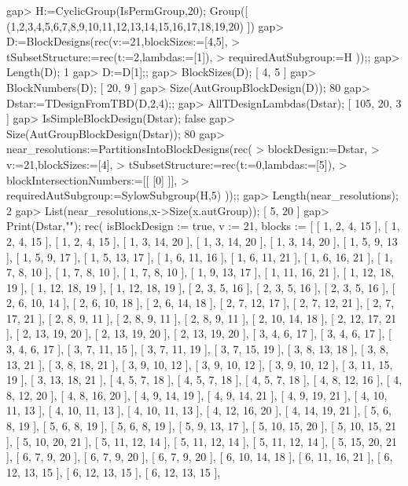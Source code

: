 \beginexample
gap> H:=CyclicGroup(IsPermGroup,20);
Group([ (1,2,3,4,5,6,7,8,9,10,11,12,13,14,15,16,17,18,19,20) ])
gap> D:=BlockDesigns(rec(v:=21,blockSizes:=[4,5],
>       tSubsetStructure:=rec(t:=2,lambdas:=[1]),
>       requiredAutSubgroup:=H ));;
gap> Length(D);
1
gap> D:=D[1];;
gap> BlockSizes(D);
[ 4, 5 ]
gap> BlockNumbers(D);
[ 20, 9 ]
gap> Size(AutGroupBlockDesign(D));
80
gap> Dstar:=TDesignFromTBD(D,2,4);;
gap> AllTDesignLambdas(Dstar);
[ 105, 20, 3 ]
gap> IsSimpleBlockDesign(Dstar);
false
gap> Size(AutGroupBlockDesign(Dstar));
80
gap> near_resolutions:=PartitionsIntoBlockDesigns(rec(
>    blockDesign:=Dstar,
>    v:=21,blockSizes:=[4],
>    tSubsetStructure:=rec(t:=0,lambdas:=[5]),
>    blockIntersectionNumbers:=[[ [0] ]],
>    requiredAutSubgroup:=SylowSubgroup(H,5) ));;
gap> Length(near_resolutions);
2
gap> List(near_resolutions,x->Size(x.autGroup));
[ 5, 20 ]
gap> Print(Dstar,"\n");
rec(
  isBlockDesign := true,
  v := 21,
  blocks := [ [ 1, 2, 4, 15 ], [ 1, 2, 4, 15 ], [ 1, 2, 4, 15 ], 
      [ 1, 3, 14, 20 ], [ 1, 3, 14, 20 ], [ 1, 3, 14, 20 ], [ 1, 5, 9, 13 ], 
      [ 1, 5, 9, 17 ], [ 1, 5, 13, 17 ], [ 1, 6, 11, 16 ], [ 1, 6, 11, 21 ], 
      [ 1, 6, 16, 21 ], [ 1, 7, 8, 10 ], [ 1, 7, 8, 10 ], [ 1, 7, 8, 10 ], 
      [ 1, 9, 13, 17 ], [ 1, 11, 16, 21 ], [ 1, 12, 18, 19 ], 
      [ 1, 12, 18, 19 ], [ 1, 12, 18, 19 ], [ 2, 3, 5, 16 ], [ 2, 3, 5, 16 ], 
      [ 2, 3, 5, 16 ], [ 2, 6, 10, 14 ], [ 2, 6, 10, 18 ], [ 2, 6, 14, 18 ], 
      [ 2, 7, 12, 17 ], [ 2, 7, 12, 21 ], [ 2, 7, 17, 21 ], [ 2, 8, 9, 11 ], 
      [ 2, 8, 9, 11 ], [ 2, 8, 9, 11 ], [ 2, 10, 14, 18 ], [ 2, 12, 17, 21 ], 
      [ 2, 13, 19, 20 ], [ 2, 13, 19, 20 ], [ 2, 13, 19, 20 ], 
      [ 3, 4, 6, 17 ], [ 3, 4, 6, 17 ], [ 3, 4, 6, 17 ], [ 3, 7, 11, 15 ], 
      [ 3, 7, 11, 19 ], [ 3, 7, 15, 19 ], [ 3, 8, 13, 18 ], [ 3, 8, 13, 21 ], 
      [ 3, 8, 18, 21 ], [ 3, 9, 10, 12 ], [ 3, 9, 10, 12 ], [ 3, 9, 10, 12 ], 
      [ 3, 11, 15, 19 ], [ 3, 13, 18, 21 ], [ 4, 5, 7, 18 ], [ 4, 5, 7, 18 ], 
      [ 4, 5, 7, 18 ], [ 4, 8, 12, 16 ], [ 4, 8, 12, 20 ], [ 4, 8, 16, 20 ], 
      [ 4, 9, 14, 19 ], [ 4, 9, 14, 21 ], [ 4, 9, 19, 21 ], [ 4, 10, 11, 13 ],
      [ 4, 10, 11, 13 ], [ 4, 10, 11, 13 ], [ 4, 12, 16, 20 ], 
      [ 4, 14, 19, 21 ], [ 5, 6, 8, 19 ], [ 5, 6, 8, 19 ], [ 5, 6, 8, 19 ], 
      [ 5, 9, 13, 17 ], [ 5, 10, 15, 20 ], [ 5, 10, 15, 21 ], 
      [ 5, 10, 20, 21 ], [ 5, 11, 12, 14 ], [ 5, 11, 12, 14 ], 
      [ 5, 11, 12, 14 ], [ 5, 15, 20, 21 ], [ 6, 7, 9, 20 ], [ 6, 7, 9, 20 ], 
      [ 6, 7, 9, 20 ], [ 6, 10, 14, 18 ], [ 6, 11, 16, 21 ], 
      [ 6, 12, 13, 15 ], [ 6, 12, 13, 15 ], [ 6, 12, 13, 15 ], 

